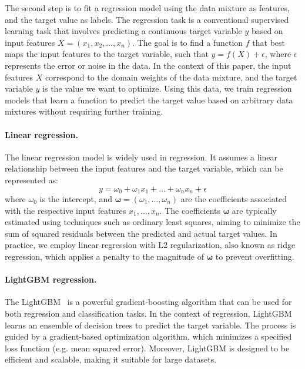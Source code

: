 The second step is to fit a regression model using the data mixture as features, and the target value as labels.
The regression task is a conventional supervised learning task that involves predicting a continuous target variable $y$ based on input features $X = (x_1, x_2, \ldots, x_n)$. The goal is to find a function $f$ that best maps the input features to the target variable, such that $y=f(X) +\epsilon$, where $\epsilon$ represents the error or noise in the data. In the context of this paper, the input features $X$ correspond to the domain weights of the data mixture, and the target variable $y$ is the value we want to optimize. Using this data, we train regression models that learn a function to predict the target value based on arbitrary data mixtures without requiring further training.

\paragraph{Linear regression.}
The linear regression model is widely used in regression. It assumes a linear relationship between the input features and the target variable, which can be represented as:
\begin{equation}
y = \omega_0 + \omega_1 x_1 + \ldots + \omega_n x_n + \epsilon
\end{equation}
where $\omega_0$ is the intercept, and $\boldsymbol{\omega}=(\omega_1, \ldots, \omega_n)$ are the coefficients associated with the respective input features $x_1, \ldots, x_n$.
The coefficients $\boldsymbol{\omega}$ are typically estimated using techniques such as ordinary least squares, aiming to minimize the sum of squared residuals between the predicted and actual target values. In practice, we employ linear regression with L2 regularization, also known as ridge regression, which applies a penalty to the magnitude of $\boldsymbol{\omega}$ to prevent overfitting.

\paragraph{LightGBM regression.}
The LightGBM~\citep{ke2017lightgbm} is a powerful gradient-boosting algorithm that can be used for both regression and classification tasks. In the context of regression, LightGBM learns an ensemble of decision trees to predict the target variable. 
The process is guided by a gradient-based optimization algorithm, which minimizes a specified loss function (e.g. mean squared error). Moreover, LightGBM is designed to be efficient and scalable, making it suitable for large datasets.

